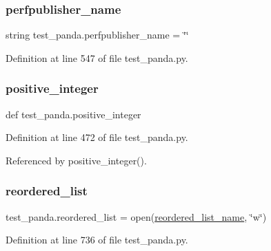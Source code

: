 \subsubsection{\texorpdfstring{perfpublisher\+\_\+name}{perfpublisher\_name}}
{\footnotesize\ttfamily string test\+\_\+panda.\+perfpublisher\+\_\+name = \char`\"{}\char`\"{}}



Definition at line 547 of file test\+\_\+panda.\+py.

\mbox{\label{namespacetest__panda_a22223479047f14974bf2c5287be2c411}} 
\subsubsection{\texorpdfstring{positive\+\_\+integer}{positive\_integer}}
{\footnotesize\ttfamily def test\+\_\+panda.\+positive\+\_\+integer}



Definition at line 472 of file test\+\_\+panda.\+py.



Referenced by positive\+\_\+integer().

\mbox{\label{namespacetest__panda_a22156bbf1a169c8e689ef6cdb5b7b7c7}} 
\subsubsection{\texorpdfstring{reordered\+\_\+list}{reordered\_list}}
{\footnotesize\ttfamily test\+\_\+panda.\+reordered\+\_\+list = open(\hyperlink{namespacetest__panda_a171d0c5a01b314cd3babab2cfbf170d2}{reordered\+\_\+list\+\_\+name}, \char`\"{}w\char`\"{})}



Definition at line 736 of file test\+\_\+panda.\+py.

\mbox{\label{namespacetest__panda_a171d0c5a01b314cd3babab2cfbf170d2}} 

